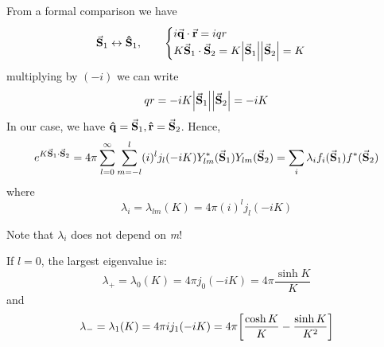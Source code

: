\documentclass[../../Main/Main.tex]{subfiles}
\begin{document}
From a formal comparison we have
  \begin{equation}
    \va{S}_1 \leftrightarrow \vu{S}_1, \qquad
      \begin{cases}
           i \va{q}\cdot \va{r} = iqr \\
           K \va{S}_1 \cdot \va{S}_2 = K \abs{\va{S}_1} \abs{\va{S}_2} = K
      \end{cases}
  \end{equation}
  multiplying by \( (-i) \)  we can write
  \begin{equation}
    qr = -iK \abs{\va{S}_1} \abs{\va{S}_2} = -iK
  \end{equation}
  In our case, we have
  \( \vu{q} = \va{S}_1, \vu{r} = \va{S}_2 \). Hence,
  \begin{equation}
    e^{K \va{S}_1 \cdot \va{S}_2} = 4 \pi  \sum_{l=0}^{\infty } \sum_{m=-l}^{l} (i)^l j_l (-iK) Y_{lm}^* (\va{S}_1) Y_{lm} (\va{S}_2) = \sum_{i}^{} \lambda _i f_i (\va{S}_1) f^* (\va{S}_2)
  \end{equation}
where
\begin{equation}
  \lambda _i = \lambda _{lm} (K) = 4 \pi (i)^l j_l (-iK)
\end{equation}
\begin{remark}
Note that \( \lambda _i \) does not depend on \emph{m}!
\end{remark}


If \( l=0 \), the largest eigenvalue is:
\begin{equation*}
  \lambda _+ = \lambda _0 (K) = 4 \pi j_0 (-iK) = 4 \pi \frac{\sinh K }{K}
\end{equation*}
and
\begin{equation*}
  \lambda _- = \lambda _1 (K) = 4 \pi i j_1 (-iK) = 4 \pi \qty[\frac{\cosh K }{K}-\frac{\sinh K }{K^2}]
\end{equation*}
\end{document}
